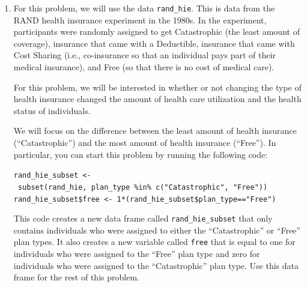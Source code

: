 \documentclass[
  letterpaper,
  DIV=11,
  numbers=noendperiod]{scrreprt}
\begin{document}
\begin{enumerate}
\def\labelenumi{\arabic{enumi}.}
\item
  For this problem, we will use the data \texttt{rand\_hie}. This is
  data from the RAND health insurance experiment in the 1980s. In the
  experiment, participants were randomly assigned to get Catastrophic
  (the least amount of coverage), insurance that came with a Deductible,
  insurance that came with Cost Sharing (i.e., co-insurance so that an
  individual pays part of their medical insurance), and Free (so that
  there is no cost of medical care).

  For this problem, we will be interested in whether or not changing the
  type of health insurance changed the amount of health care utilization
  and the health status of individuals.

  We will focus on the difference between the least amount of health
  insurance (``Catastrophic'') and the most amount of health insurance
  (``Free''). In particular, you can start this problem by running the
  following code:

  \texttt{rand\_hie\_subset\ \textless{}-\ subset(rand\_hie,\ plan\_type\ \%in\%\ c("Catastrophic",\ "Free"))}
  \texttt{rand\_hie\_subset\$free\ \textless{}-\ 1*(rand\_hie\_subset\$plan\_type=="Free")}

  This code creates a new data frame called \texttt{rand\_hie\_subset}
  that only contains individuals who were assigned to either the
  ``Catastrophic'' or ``Free'' plan types. It also creates a new
  variable called \texttt{free} that is equal to one for individuals who
  were assigned to the ``Free'' plan type and zero for individuals who
  were assigned to the ``Catastrophic'' plan type. Use this data frame
  for the rest of this problem.


\end{enumerate}
\end{document}
